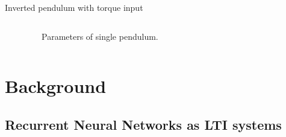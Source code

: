 \documentclass[8pt, t,
aspectratio=169,%
]{beamer}
\begin{document}
\begin{frame}{Inverted pendulum with torque input}
\begin{columns}[]
\begin{onlyenv}
        \end{onlyenv}
        
        \vspace{-0.7cm}
        \begin{figure}
            
            \caption{Parameters of single pendulum.}
        \end{figure}
    \end{columns}

\end{frame}


\section{Background}

\subsection{Recurrent Neural Networks as LTI systems}
\end{document}
